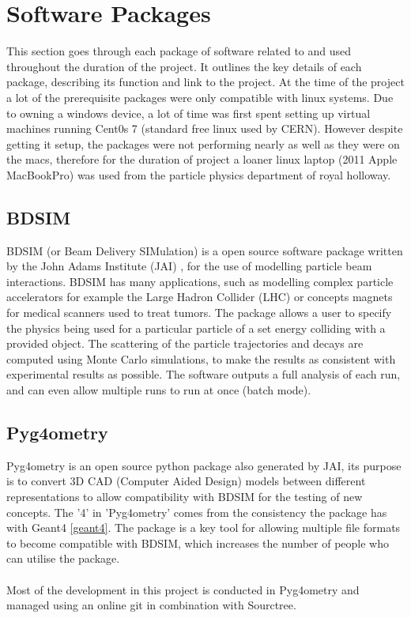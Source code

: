 \documentclass[12pt,a4paper]{article}
\begin{document}

\section{Software Packages}
\label{packs}
This section goes through each package of software related to and used throughout the duration of the project. It outlines the key details of each package, describing its function and link to the project. At the time of the project a lot of the prerequisite packages were only compatible with linux systems. Due to owning a windows device, a lot of time was first spent setting up virtual machines running Cent0s 7 (standard free linux used by CERN). However despite getting it setup, the packages were not performing nearly as well as they were on the macs, therefore for the duration of project a loaner linux laptop (2011 Apple MacBookPro) was used from the particle physics department of royal holloway. 

\subsection{BDSIM}
\label{bdsim}
BDSIM (or Beam Delivery SIMulation) is a open source software package written by the John Adams Institute (JAI) \cite{jai}, for the use of modelling particle beam interactions. BDSIM has many applications, such as modelling complex particle accelerators for example the Large Hadron Collider (LHC) or concepts magnets for medical scanners used to treat tumors. The package allows a user to specify the physics being used for a particular particle of a set energy colliding with a provided object. The scattering of the particle trajectories and decays are computed using Monte Carlo simulations, to make the results as consistent with experimental results as possible. The software outputs a full analysis of each run, and can even allow multiple runs to run at once (batch mode).

\subsection{Pyg4ometry}
\label{pyg}
Pyg4ometry is an open source python package also generated by JAI, its purpose is to convert 3D CAD (Computer Aided Design) models between different representations to allow compatibility with BDSIM for the testing of new concepts. The '4' in 'Pyg4ometry' comes from the consistency the package has with Geant4 \ref{geant4}. The package is a key tool for allowing multiple file formats to become compatible with BDSIM, which increases the number of people who can utilise the package.
\\\\
Most of the development in this project is conducted in Pyg4ometry and managed using an online git in combination with Sourctree. 
\end{document}
